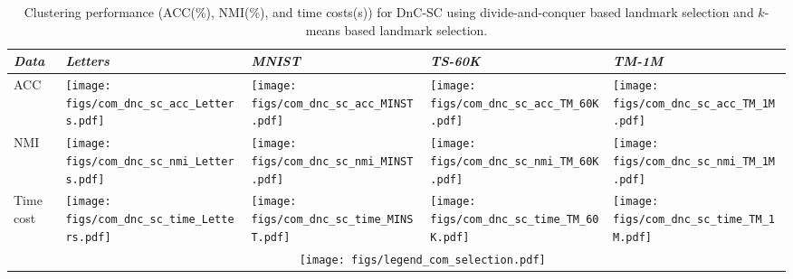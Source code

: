 \begin{table}\centering
  \caption{Clustering performance (ACC(\%), NMI(\%), and time costs(s)) for DnC-SC using divide-and-conquer based landmark selection and $k$-means based landmark selection.}
  \label{table:compare_sel_strategies}
  \begin{threeparttable}
    \begin{tabular}{m{0.75cm}<{\centering}|m{1.45cm}<{\centering}m{1.45cm}<{\centering}m{1.45cm}<{\centering}m{1.45cm}<{\centering}}
      \toprule
      \emph{Data} & \emph{Letters} & \emph{MNIST} & \emph{TS-60K} & \emph{TM-1M} \\
      \midrule
      \multirow{1}{*}{ACC}
      &\texttt{[image: figs/com\_dnc\_sc\_acc\_Letters.pdf]}
      &\texttt{[image: figs/com\_dnc\_sc\_acc\_MINST.pdf]}
      &\texttt{[image: figs/com\_dnc\_sc\_acc\_TM\_60K.pdf]}
      &\texttt{[image: figs/com\_dnc\_sc\_acc\_TM\_1M.pdf]}\\
      NMI
      &\texttt{[image: figs/com\_dnc\_sc\_nmi\_Letters.pdf]}
      &\texttt{[image: figs/com\_dnc\_sc\_nmi\_MINST.pdf]}
      &\texttt{[image: figs/com\_dnc\_sc\_nmi\_TM\_60K.pdf]}
      &\texttt{[image: figs/com\_dnc\_sc\_nmi\_TM\_1M.pdf]}\\
      Time cost
      &\texttt{[image: figs/com\_dnc\_sc\_time\_Letters.pdf]}
      &\texttt{[image: figs/com\_dnc\_sc\_time\_MINST.pdf]}
      &\texttt{[image: figs/com\_dnc\_sc\_time\_TM\_60K.pdf]}
      &\texttt{[image: figs/com\_dnc\_sc\_time\_TM\_1M.pdf]}\\
      &\multicolumn{4}{c}{\texttt{[image: figs/legend\_com\_selection.pdf]}}\\
      \bottomrule
    \end{tabular}
  \end{threeparttable}
\end{table}

